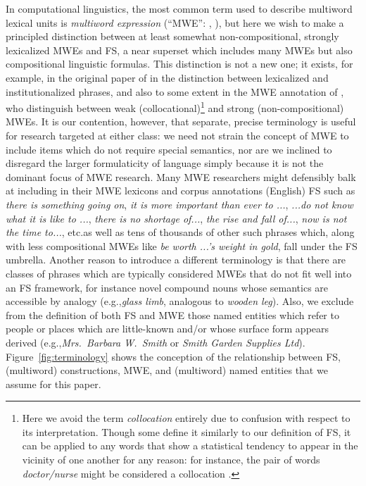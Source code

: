 \documentclass[11pt,letterpaper]{article}
\makeatletter
\def \eg {e.g.,\@ }
\def \etc {etc.\@ }
\newcommand{\dotts}{...}
\newcommand{\ex}[1]{\textit{#1}\xspace}
\newcommand{\figref}[2][]{Figure#1~\ref{#2}\xspace}
\makeatother
\begin{document}
In computational linguistics, the most common term used to describe multiword lexical units is \emph{multiword expression} (``MWE'': , ), but here we wish to make a principled distinction between at least somewhat non-compositional, strongly lexicalized MWEs and FS, a near superset which includes many MWEs but also compositional linguistic formulas. This distinction is not a new one; it exists, for example, in the original paper of  in the distinction between lexicalized and institutionalized phrases, and also to some extent in the MWE annotation of , who distinguish between weak (collocational)\footnote{Here we avoid the term \emph{collocation} entirely due to confusion with respect to its interpretation. Though some define it similarly to our definition of FS, it can be applied to any words that show a statistical tendency to appear in the vicinity of one another for any reason: for instance, the pair of words \ex{doctor/nurse} might be considered a collocation \cite{Ramisch14}.}  and strong (non-compositional) MWEs. It is our contention, however, that separate, precise terminology is useful for research targeted at either class: we need not strain the concept of MWE to include items which do not require special semantics, nor are we inclined to disregard the larger formulaticity of language simply because it is not the dominant focus of MWE research. Many MWE researchers might defensibly balk at including in their MWE lexicons and corpus annotations (English) FS such as \ex{there is something going on}, \ex{it is more important than ever to \dotts}, \ex{\dotts do not know what it is like to \dotts}, \ex{there is no shortage of\dotts}, \ex{the rise and fall of\dotts}, \ex{now is not the time to\dotts}, \etc as well as tens of thousands of other such phrases which, along with less compositional MWEs like \ex{be worth \dotts's weight in gold}, fall under the FS umbrella. Another reason to introduce a different terminology is that there are classes of phrases which are typically considered MWEs that do not fit well into an FS framework, for instance novel compound nouns whose semantics are accessible by analogy (\eg \ex{glass limb}, analogous to \ex{wooden leg}). Also, we exclude from the definition of both FS and MWE those named entities which refer to people or places which are little-known and/or whose surface form appears derived (\eg \ex{Mrs.\ Barbara W.\ Smith} or \ex{Smith Garden Supplies Ltd}). \figref{fig:terminology} shows the conception of the relationship between FS, (multiword) constructions, MWE, and (multiword) named entities that we assume for this paper.
\end{document}
